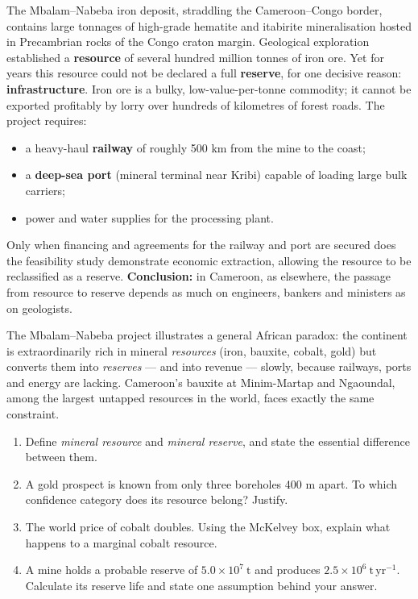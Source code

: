 \documentclass[11pt]{article}
\newcounter{popsec}
\newcounter{popsub}
\newcommand{\courssub}[1]{%
  \stepcounter{popsub}%
  \par\vspace{9pt}\noindent{\popxbold\fontsize{11.5}{13}\selectfont\color{popink}{\color{poporange}\thepopsec.\thepopsub}\hspace{6pt}#1}\par\nopagebreak\vspace{4pt}
}
\begin{document}
\courssub{Case Study: the Mbalam--Nabeba Iron Project}

\begin{experience}
The Mbalam--Nabeba iron deposit, straddling the Cameroon--Congo border, contains large tonnages of high-grade hematite and itabirite mineralisation hosted in Precambrian rocks of the Congo craton margin. Geological exploration established a \textbf{resource} of several hundred million tonnes of iron ore. Yet for years this resource could not be declared a full \textbf{reserve}, for one decisive reason: \textbf{infrastructure}. Iron ore is a bulky, low-value-per-tonne commodity; it cannot be exported profitably by lorry over hundreds of kilometres of forest roads. The project requires:
\begin{itemize}
\item a heavy-haul \textbf{railway} of roughly 500 km from the mine to the coast;
\item a \textbf{deep-sea port} (mineral terminal near Kribi) capable of loading large bulk carriers;
\item power and water supplies for the processing plant.
\end{itemize}
Only when financing and agreements for the railway and port are secured does the feasibility study demonstrate economic extraction, allowing the resource to be reclassified as a reserve. \textbf{Conclusion:} in Cameroon, as elsewhere, the passage from resource to reserve depends as much on engineers, bankers and ministers as on geologists.
\end{experience}

\begin{savaistu}
The Mbalam--Nabeba project illustrates a general African paradox: the continent is extraordinarily rich in mineral \emph{resources} (iron, bauxite, cobalt, gold) but converts them into \emph{reserves} --- and into revenue --- slowly, because railways, ports and energy are lacking. Cameroon's bauxite at Minim-Martap and Ngaoundal, among the largest untapped resources in the world, faces exactly the same constraint.
\end{savaistu}

\begin{exercice}
\begin{enumerate}
\item Define \emph{mineral resource} and \emph{mineral reserve}, and state the essential difference between them.
\item A gold prospect is known from only three boreholes 400 m apart. To which confidence category does its resource belong? Justify.
\item The world price of cobalt doubles. Using the McKelvey box, explain what happens to a marginal cobalt resource.
\item A mine holds a probable reserve of $5.0 \times 10^{7}\ \mathrm{t}$ and produces $2.5 \times 10^{6}\ \mathrm{t\,yr^{-1}}$. Calculate its reserve life and state one assumption behind your answer.
\end{enumerate}
\end{exercice}
\end{document}
